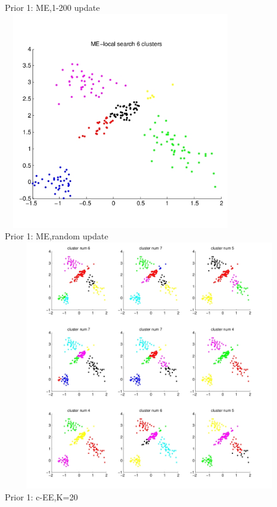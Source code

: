 \documentclass{article}
\begin{document}
\begin{spacing}{1.1}
 \begin{center}
Prior 1: ME,1-200 update\\    
\includegraphics[width=4in,height=3.7in]{0_me_1.jpg}\\
Prior 1: ME,random update\\
\includegraphics[width=5in,height=4.25in]{0_me_r.jpg} \\
Prior 1: c-EE,K=20\\

\end{center}
\end{spacing}
\end{document}
